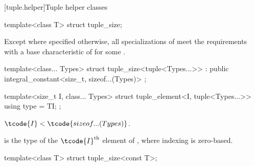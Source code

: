 [tuple.helper]{Tuple helper classes}

%
\begin{itemdecl}
template<class T> struct tuple_size;
\end{itemdecl}

\begin{itemdescr}
\pnum
Except where specified otherwise,
all specializations of  meet the
 requirements with a
base characteristic of 
for some .
\end{itemdescr}

%
\begin{itemdecl}
template<class... Types>
  struct tuple_size<tuple<Types...>> : public integral_constant<size_t, sizeof...(Types)> { };
\end{itemdecl}

%
\begin{itemdecl}
template<size_t I, class... Types>
  struct tuple_element<I, tuple<Types...>> {
    using type = TI;
  };
\end{itemdecl}

\begin{itemdescr}
\pnum
\mandates
$\tcode{I} < \tcode{sizeof...(Types)}$.

\pnum
\ctype
{} is the
type of the $\tcode{I}^\text{th}$ element of ,
where indexing is zero-based.
\end{itemdescr}

%
\begin{itemdecl}
template<class T> struct tuple_size<const T>;
\end{itemdecl}

